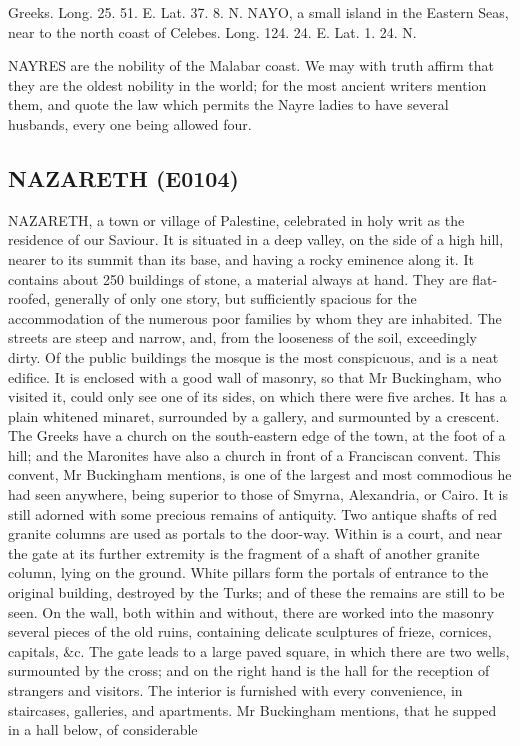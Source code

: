 \documentclass{article}
\begin{document}
Greeks. Long. 25. 51. E. Lat. 37. 8. N.
NAYO, a small island in the Eastern Seas, near to the
north coast of Celebes. Long. 124. 24. E. Lat. 1. 24. N.

NAYRES are the nobility of the Malabar coast. We may with truth affirm that they are the oldest nobility in the world; for the most ancient writers mention them, and quote the law which permits the Nayre ladies to have several husbands, every one being allowed four.

\subsection*{NAZARETH (E0104)}
NAZARETH, a town or village of Palestine, celebrated in holy writ as the residence of our Saviour. It is situated in a deep valley, on the side of a high hill, nearer to its summit than its base, and having a rocky eminence along it. It contains about 250 buildings of stone, a material always at hand. They are flat-roofed, generally of only one story, but sufficiently spacious for the accommodation of the numerous poor families by whom they are inhabited. The streets are steep and narrow, and, from the looseness of the soil, exceedingly dirty. Of the public buildings the mosque is the most conspicuous, and is a neat edifice. It is enclosed with a good wall of masonry, so that Mr Buckingham, who visited it, could only see one of its sides, on which there were five arches. It has a plain whitened minaret, surrounded by a gallery, and surmounted by a crescent. The Greeks have a church on the south-eastern edge of the town, at the foot of a hill; and the Maronites have also a church in front of a Franciscan convent. This convent, Mr Buckingham mentions, is one of the largest and most commodious he had seen anywhere, being superior to those of Smyrna, Alexandria, or Cairo. It is still adorned with some precious remains of antiquity. Two antique shafts of red granite columns are used as portals to the door-way. Within is a court, and near the gate at its further extremity is the fragment of a shaft of another granite column, lying on the ground. White pillars form the portals of entrance to the original building, destroyed by the Turks; and of these the remains are still to be seen. On the wall, both within and without, there are worked into the masonry several pieces of the old ruins, containing delicate sculptures of frieze, cornices, capitals, \&c. The gate leads to a large paved square, in which there are two wells, surmounted by the cross; and on the right hand is the hall for the reception of strangers and visitors. The interior is furnished with every convenience, in staircases, galleries, and apartments. Mr Buckingham mentions, that he supped in a hall below, of considerable
\end{document}
